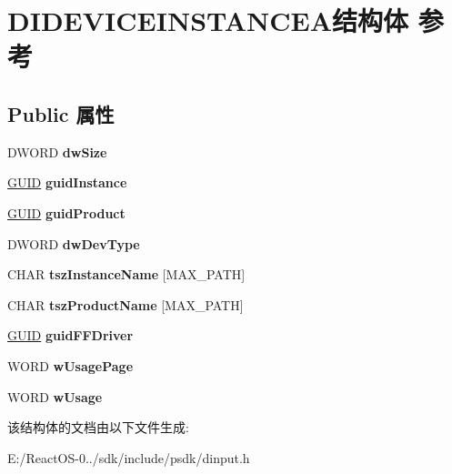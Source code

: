 \hypertarget{struct_d_i_d_e_v_i_c_e_i_n_s_t_a_n_c_e_a}{}\section{D\+I\+D\+E\+V\+I\+C\+E\+I\+N\+S\+T\+A\+N\+C\+E\+A结构体 参考}
\label{struct_d_i_d_e_v_i_c_e_i_n_s_t_a_n_c_e_a}
\subsection*{Public 属性}
\begin{DoxyCompactItemize}
\item 
\mbox{\label{struct_d_i_d_e_v_i_c_e_i_n_s_t_a_n_c_e_a_af8e77cbdc28ee930992e652d75521943}} 
D\+W\+O\+RD {\bfseries dw\+Size}
\item 
\mbox{\label{struct_d_i_d_e_v_i_c_e_i_n_s_t_a_n_c_e_a_a5090841ff6d5a076138e5feecc16e908}} 
\hyperlink{interface_g_u_i_d}{G\+U\+ID} {\bfseries guid\+Instance}
\item 
\mbox{\label{struct_d_i_d_e_v_i_c_e_i_n_s_t_a_n_c_e_a_a2075eb10c9f2a576821322f316e0c307}} 
\hyperlink{interface_g_u_i_d}{G\+U\+ID} {\bfseries guid\+Product}
\item 
\mbox{\label{struct_d_i_d_e_v_i_c_e_i_n_s_t_a_n_c_e_a_aefe3c9863c8d29ff60607e049d1f819d}} 
D\+W\+O\+RD {\bfseries dw\+Dev\+Type}
\item 
\mbox{\label{struct_d_i_d_e_v_i_c_e_i_n_s_t_a_n_c_e_a_a50c4dc6ed1f03e26c42f6738361665e4}} 
C\+H\+AR {\bfseries tsz\+Instance\+Name} \mbox{[}M\+A\+X\+\_\+\+P\+A\+TH\mbox{]}
\item 
\mbox{\label{struct_d_i_d_e_v_i_c_e_i_n_s_t_a_n_c_e_a_aa77c89e6efa6040214cbfe196f050e72}} 
C\+H\+AR {\bfseries tsz\+Product\+Name} \mbox{[}M\+A\+X\+\_\+\+P\+A\+TH\mbox{]}
\item 
\mbox{\label{struct_d_i_d_e_v_i_c_e_i_n_s_t_a_n_c_e_a_a331d10d3bd5e19435cd7c89d6e9e59c0}} 
\hyperlink{interface_g_u_i_d}{G\+U\+ID} {\bfseries guid\+F\+F\+Driver}
\item 
\mbox{\label{struct_d_i_d_e_v_i_c_e_i_n_s_t_a_n_c_e_a_a02b8b39330eccedddfa3b965583d7d65}} 
W\+O\+RD {\bfseries w\+Usage\+Page}
\item 
\mbox{\label{struct_d_i_d_e_v_i_c_e_i_n_s_t_a_n_c_e_a_a0f1928849f72830a408a9b4e15313e56}} 
W\+O\+RD {\bfseries w\+Usage}
\end{DoxyCompactItemize}


该结构体的文档由以下文件生成\+:\begin{DoxyCompactItemize}
\item 
E\+:/\+React\+O\+S-\/0../sdk/include/psdk/dinput.\+h\end{DoxyCompactItemize}
